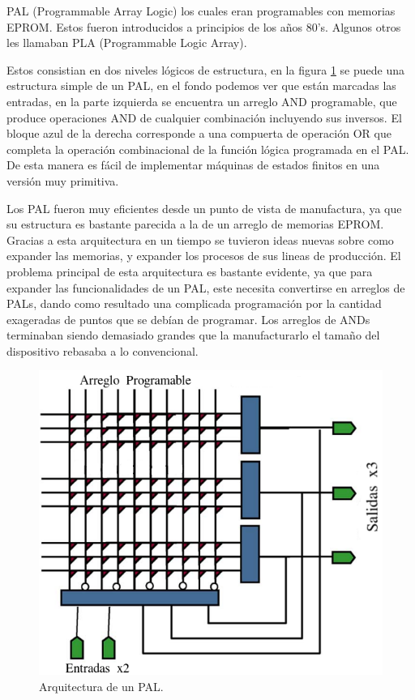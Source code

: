 \documentclass[twoside,spanish,ESP,MSc]{plantillaLabUPV}
\theoremstyle{definition}
\begin{document}
PAL (Programmable Array Logic) los cuales eran programables con memorias EPROM. Estos fueron introducidos a principios de los años 80's. Algunos otros les llamaban PLA (Programmable Logic Array).

Estos consistian en dos niveles lógicos de estructura, en la figura \ref{pal} se puede una estructura simple de un PAL, en el fondo podemos ver que están marcadas las entradas, en la parte izquierda se encuentra un arreglo AND programable, que produce operaciones AND de cualquier combinación incluyendo sus inversos. El bloque azul de la derecha corresponde a una compuerta de operación OR que completa la operación combinacional de la función lógica programada en el PAL. De esta manera es fácil de implementar máquinas de estados finitos en una versión muy primitiva.

Los PAL fueron muy eficientes desde un punto de vista de manufactura, ya que su estructura es bastante parecida a la de un arreglo de memorias EPROM. Gracias a esta arquitectura en un tiempo se tuvieron ideas nuevas sobre como expander las memorias, y expander los procesos de sus lineas de producción. El problema principal de esta arquitectura es bastante evidente, ya que para expander las funcionalidades de un PAL, este necesita convertirse en arreglos de PALs, dando como resultado una complicada programación por la cantidad exageradas de puntos que se debían de programar. Los arreglos de ANDs terminaban siendo demasiado grandes que la manufacturarlo el tamaño del dispositivo rebasaba a lo convencional. 

\begin{figure}[!tbh]
\centering
\includegraphics[scale=0.45]{ima/pal.png}
\caption{Arquitectura de un PAL.}%
\label{pal}
\end{figure}
\end{document}

